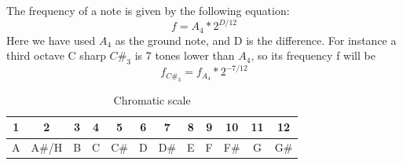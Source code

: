 The frequency of a note is given by the following equation: $$f = A_{4}*2^{D/12}$$
Here we have used $A_4$ as the ground note, and D is the difference. For instance a third octave C sharp $C\#_3$ is 7 tones lower than $A_4$, so its frequency f will be $$f_{C\#_{3}} = f_{A_{4}}*2^{-7/12}$$

\begin{table}[H]
  \begin{center}
  \begin{tabular}{ |c|c|c|c|c|c|c|c|c|c|c|c| }
    \hline
    1 & 2 & 3 & 4 & 5 & 6 & 7 & 8 & 9 & 10 & 11 & 12 \\
    \hline
    A & A\#/H & B & C & C\# & D & D\# & E & F & F\# & G & G\# \\
    \hline

  \end{tabular}
  \caption{Chromatic scale}
  \label{tab:chromatic-scale}
  \end{center}
\end{table}
